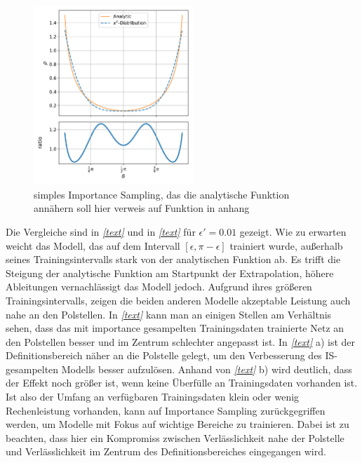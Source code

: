 \begin{figure}
	\centering
	\includegraphics[width=6cm]{graphics/4}
	\caption{simples Importance Sampling, das die analytische Funktion annähern soll hier verweis auf Funktion in anhang}
\end{figure}
Die Vergleiche sind in \textit{\autoref{text}} und in \textit{\autoref{text}} für $\epsilon' = 0.01$ gezeigt. Wie zu erwarten weicht das Modell, das auf dem Intervall $[\epsilon, \pi-\epsilon]$ trainiert wurde, außerhalb seines Trainingsintervalls stark von der analytischen Funktion ab. Es trifft die Steigung der analytische Funktion am Startpunkt der Extrapolation, höhere Ableitungen vernachlässigt das Modell jedoch. Aufgrund ihres größeren Trainingsintervalls, zeigen die beiden anderen Modelle akzeptable Leistung auch nahe an den Polstellen. In \textit{\autoref{text}} kann man an einigen Stellen am Verhältnis sehen, dass das mit importance gesampelten Trainingsdaten trainierte Netz an den Polstellen besser und im Zentrum schlechter angepasst ist. In \textit{\autoref{text}} a) ist der Definitionsbereich näher an die Polstelle gelegt, um den Verbesserung des IS-gesampelten Modells besser aufzulösen. Anhand von \textit{\autoref{text}} b) wird deutlich, dass der Effekt noch größer ist, wenn keine Überfülle an Trainingsdaten vorhanden ist. Ist also der Umfang an verfügbaren Trainingsdaten klein oder wenig Rechenleistung vorhanden, kann auf Importance Sampling zurückgegriffen werden, um Modelle mit Fokus auf wichtige Bereiche zu trainieren. Dabei ist zu beachten, dass hier ein Kompromiss zwischen Verlässlichkeit nahe der Polstelle und Verlässlichkeit im Zentrum des Definitionsbereiches eingegangen wird.

